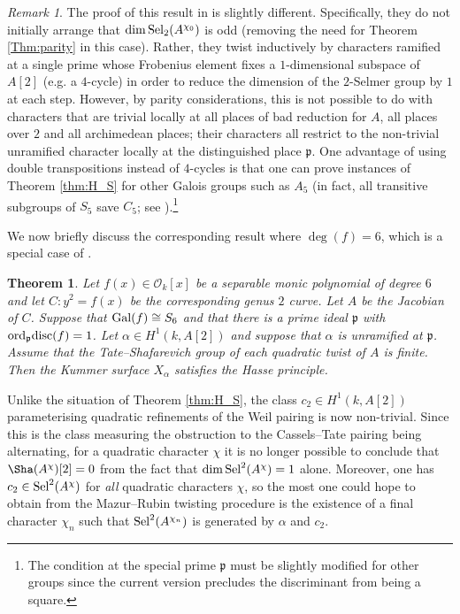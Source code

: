 \documentclass[10pt]{amsart}
\numberwithin{equation}{section}
\newtheorem{theorem}[equation]{Theorem}
\theoremstyle{remark}
\newtheorem{remark}[equation]{Remark}
\theoremstyle{definition}
\theoremstyle{definition}
\theoremstyle{definition}
\theoremstyle{definition}
\theoremstyle{definition}
\theoremstyle{definition}
\theoremstyle{definition}
\theoremstyle{definition}
\begin{document}
 \begin{remark}
 The proof of this result in \cite[Theorem B]{HS16} is slightly different. Specifically, they do not initially arrange that $\dim \textup{Sel}_2(A^{\chi_0})$ is odd (removing the need for Theorem \ref{Thm:parity} in this case). Rather, they twist inductively by characters ramified at a single prime whose Frobenius element fixes a $1$-dimensional subspace of $A[2]$ (e.g. a $4$-cycle) in order to reduce the dimension of the $2$-Selmer group by $1$ at each step. However, by parity considerations, this is not possible to do with characters that are trivial locally at all places of bad reduction for $A$, all places over $2$ and all archimedean places; their characters all restrict to the non-trivial unramified character locally at the distinguished place $\mathfrak{p}$. One advantage of using double transpositions instead of $4$-cycles is that one can prove instances of Theorem \ref{thm:H_S} for other Galois groups such as $A_5$ (in fact, all transitive subgroups of $S_5$ save $C_5$; see \cite[Section 4]{MS24}).\footnote{The condition at the special prime $\mathfrak{p}$ must be slightly modified for other groups since the current version precludes the discriminant from being a square.}
 \end{remark}
 
 
 
 We now briefly discuss the corresponding result where $\deg(f)=6$, which is a special case of \cite[Theorem 1.9]{mor2025}.
 
  \begin{theorem} \label{theorem:deg_6_case}
Let $f(x)\in \mathcal{O}_k[x]$ be a separable monic polynomial of degree $6$ and let $C:y^2=f(x)$ be the corresponding genus $2$ curve. Let $A$ be the Jacobian of $C$. Suppose that $\textup{Gal}(f)\cong S_{6}$ and that there is a prime ideal $\mathfrak{p}$ with $\textup{ord}_{\mathfrak{p}}\textup{disc}(f)=1$. Let $\alpha \in H^1(k,A[2])$ and suppose that $\alpha$ is unramified at $\mathfrak{p}$. Assume that the Tate--Shafarevich group of each quadratic twist of $A$ is finite. Then the Kummer surface $X_\alpha$ satisfies the Hasse principle. 
 \end{theorem}
  
Unlike the situation of Theorem \ref{thm:H_S}, the class $c_2\in H^1(k,A[2])$ parameterising quadratic refinements of the Weil pairing is now non-trivial.  Since this is the class  measuring the obstruction to the Cassels--Tate pairing being alternating,  for a quadratic character $\chi$ it is no longer possible to conclude that $\Sha(A^{\chi})[2]=0$ from the fact that $\dim\textup{Sel}^2(A^{\chi})=1$  alone. Moreover, one has $c_2 \in \textup{Sel}^2(A^{\chi})$ for \textit{all} quadratic characters $\chi$, so the most one could hope to obtain from the Mazur--Rubin twisting procedure is the existence of a final character $\chi_n$ such that $\textup{Sel}^2(A^{\chi_n})$ is generated by $\alpha$ and  $c_2$. 
\end{document}
